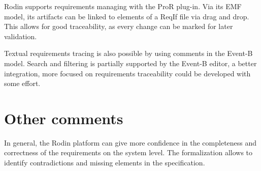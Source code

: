 \begin{author_comment}
  Rodin supports requirements managing with the ProR plug-in. Via its EMF model,
  its artifacts can be linked to elements of a ReqIf file via drag and
  drop. This allows for good traceability, as every change can be marked for
  later validation.

  Textual requirements tracing is also possible by using comments in the Event-B
  model. Search and filtering is partially supported by the Event-B editor, a
  better integration, more focused on requirements traceability could be
  developed with some effort.
\end{author_comment}

\section{Other comments}



\begin{author_comment}
  In general, the Rodin platform can give more confidence in the completeness
  and correctness of the requirements on the system level. The formalization
  allows to identify contradictions and missing elements in the specification.
\end{author_comment}


